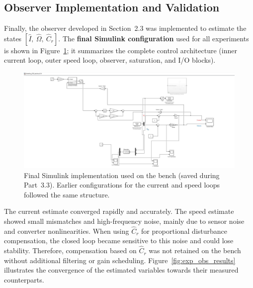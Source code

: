 \documentclass{rapportCS}
\begin{document}
\subsection{Observer Implementation and Validation}
\label{subsec:exp_obs}

Finally, the observer developed in Section~2.3 was implemented to estimate the states $[\hat I,\ \hat\Omega,\ \hat C_r]$. 
The \textbf{final Simulink configuration} used for all experiments is shown in Figure~\ref{fig:exp_obs_model}; it summarizes the complete control architecture (inner current loop, outer speed loop, observer, saturation, and I/O blocks).

\begin{figure}[H]
    \centering
    \includegraphics[width=\linewidth, keepaspectratio]{figures/simulink.png}
    \caption{Final Simulink implementation used on the bench (saved during Part~3.3). 
    Earlier configurations for the current and speed loops followed the same structure.}
    \label{fig:exp_obs_model}
\end{figure}

The current estimate converged rapidly and accurately. 
The speed estimate showed small mismatches and high-frequency noise, mainly due to sensor noise and converter nonlinearities. 
When using $\hat C_r$ for proportional disturbance compensation, the closed loop became sensitive to this noise and could lose stability. 
Therefore, compensation based on $\hat C_r$ was not retained on the bench without additional filtering or gain scheduling. 
Figure~\ref{fig:exp_obs_results} illustrates the convergence of the estimated variables towards their measured counterparts.
\end{document}
